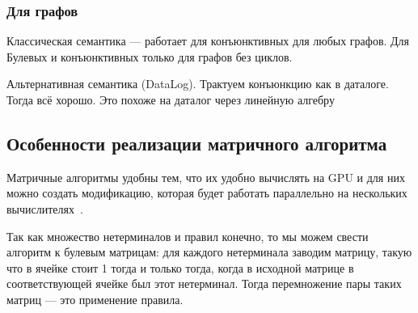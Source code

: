 \subsubsection{Для графов}


Классическая семантика --- работает для конъюнктивных для любых графов.
Для Булевых и конъюнктивных только для графов без циклов.

Альтернативная семантика (DataLog).
Трактуем конъюнкцию как в даталоге. Тогда всё хорошо.
Это похоже на даталог через линейную алгебру~\cite{!!!}
\subsection{Особенности реализации матричного алгоритма}

Матричные алгоритмы удобны тем, что их удобно вычислять на GPU и для них можно создать модификацию, которая будет работать параллельно на нескольких вычислителях~\cite{Mishin:2019:ECP:3327964.3328503}.

Так как множество нетерминалов и правил конечно, то мы можем свести алгоритм к булевым матрицам: для каждого нетерминала заводим матрицу, такую что в ячейке стоит 1 тогда и только тогда, когда в исходной матрице в соответствующей ячейке был этот нетерминал.
Тогда перемножение пары таких матриц --- это применение правила.


